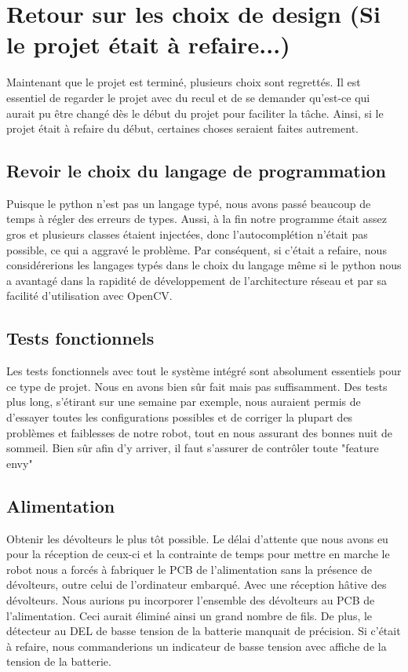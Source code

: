 \section{Retour sur les choix de design (Si le projet était à refaire...)}

Maintenant que le projet est terminé, plusieurs choix sont regrettés. Il est essentiel de regarder le projet avec du recul et de se demander qu'est-ce qui aurait pu être changé dès le début du projet pour faciliter la tâche. Ainsi, si le projet était à refaire du début, certaines choses seraient faites autrement.

\subsection{Revoir le choix du langage de programmation}
Puisque le python n’est pas un langage typé, nous avons passé beaucoup de temps à régler des erreurs de types. Aussi, à la fin notre programme était assez gros et plusieurs classes étaient injectées, donc l’autocomplétion n’était pas possible, ce qui a aggravé le problème. Par conséquent, si c’était a refaire, nous considérerions les langages typés dans le choix du langage même si le python nous a avantagé dans la rapidité de développement de l’architecture réseau et par sa facilité d’utilisation avec OpenCV.

\subsection{Tests fonctionnels}
Les tests fonctionnels avec tout le système intégré sont absolument essentiels pour ce type de projet. Nous en avons bien sûr fait mais pas suffisamment. Des tests plus long, s'étirant sur une semaine par exemple, nous auraient permis de d'essayer toutes les configurations possibles et de corriger la plupart des problèmes et faiblesses de notre robot, tout en nous assurant des bonnes nuit de sommeil. Bien sûr afin d'y arriver, il faut s'assurer de contrôler toute "feature envy"

\subsection{Alimentation}
Obtenir les dévolteurs le plus tôt possible. Le délai d’attente que nous avons eu pour la réception de ceux-ci et la contrainte de temps pour mettre en marche le robot nous a forcés à fabriquer le PCB de l’alimentation sans la présence de dévolteurs, outre celui de l'ordinateur embarqué. Avec une réception hâtive des dévolteurs. Nous aurions pu incorporer l’ensemble des dévolteurs au PCB de l’alimentation. Ceci aurait éliminé ainsi un grand nombre de fils. De plus, le détecteur au DEL de basse tension de la batterie manquait de précision. Si c’était à refaire, nous commanderions un indicateur de basse tension avec affiche de la tension de la batterie. 
